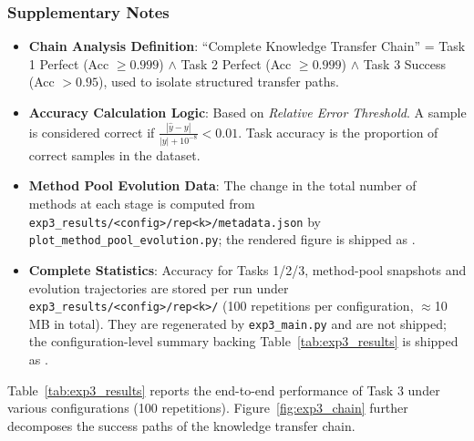\subsubsection{Supplementary Notes}
\begin{itemize}
    \item \textbf{Chain Analysis Definition}: ``Complete Knowledge Transfer Chain'' = Task 1 Perfect (Acc $\ge 0.999$) $\land$ Task 2 Perfect (Acc $\ge 0.999$) $\land$ Task 3 Success (Acc $> 0.95$), used to isolate structured transfer paths.
    \item \textbf{Accuracy Calculation Logic}: Based on \textit{Relative Error Threshold}. A sample is considered correct if $\frac{|\hat{y} - y|}{|y| + 10^{-8}} < 0.01$. Task accuracy is the proportion of correct samples in the dataset.
    \item \textbf{Method Pool Evolution Data}: The change in the total number of methods at each stage is computed from \texttt{exp3\_results/\textless config\textgreater/rep\textless k\textgreater/metadata.json} by \texttt{plot\_method\_pool\_evolution.py}; the rendered figure is shipped as .
    \item \textbf{Complete Statistics}: Accuracy for Tasks 1/2/3, method-pool snapshots and evolution trajectories are stored per run under \texttt{exp3\_results/\textless config\textgreater/rep\textless k\textgreater/} (100 repetitions per configuration, $\approx$10\,MB in total). They are regenerated by \texttt{exp3\_main.py} and are not shipped; the configuration-level summary backing Table~\ref{tab:exp3_results} is shipped as .
\end{itemize}

Table~\ref{tab:exp3_results} reports the end-to-end performance of Task 3 under various configurations (100 repetitions). Figure~\ref{fig:exp3_chain} further decomposes the success paths of the knowledge transfer chain.

